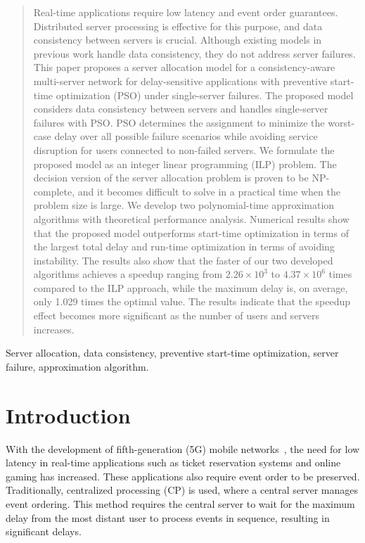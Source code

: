 \documentclass[10pt, letterpaper]{IEEEtran}
\begin{document}
\begin{CJK}{UTF8}{ipxm}
\begin{abstract}
Real-time applications require low latency and event order guarantees.  
Distributed server processing is effective for this purpose, and data consistency between servers is crucial.  
Although existing models in previous work handle data consistency, they do not address server failures.  
This paper proposes a server allocation model for a consistency-aware multi-server network for delay-sensitive applications with preventive start-time optimization (PSO) under single-server failures.
The proposed model considers data consistency between servers and handles single-server failures with PSO.
PSO determines the assignment to minimize the worst-case delay over all possible failure scenarios while avoiding service disruption for users connected to non-failed servers.  
We formulate the proposed model as an integer linear programming (ILP) problem.  
The decision version of the server allocation problem is proven to be NP-complete, and it becomes difficult to solve in a practical time when the problem size is large.  
We develop two polynomial-time approximation algorithms with theoretical performance analysis. 
Numerical results show that the proposed model outperforms start-time optimization in terms of the largest total delay and run-time optimization in terms of avoiding instability.  
The results also show that the faster of our two developed algorithms achieves a speedup ranging from $2.26 \times 10^3$ to $4.37 \times 10^6$ times compared to the ILP approach, while the maximum delay is, on average, only 1.029 times the optimal value.
The results indicate that the speedup effect becomes more significant as the number of users and servers increases.
\end{abstract}
\begin{IEEEkeywords}
  Server allocation, data consistency, preventive start-time optimization, server failure, approximation algorithm.
\end{IEEEkeywords}

\section{Introduction}
\label{sec:introduction}

With the development of fifth-generation (5G) mobile networks~\cite{DOCOMO_5G}, the need for low latency in real-time applications such as ticket reservation systems and online gaming has increased.
These applications also require event order to be preserved.
Traditionally, centralized processing (CP) is used, where a central server manages event ordering.
This method requires the central server to wait for the maximum delay from the most distant user to process events in sequence, resulting in significant delays.


\end{CJK}
\end{document}
